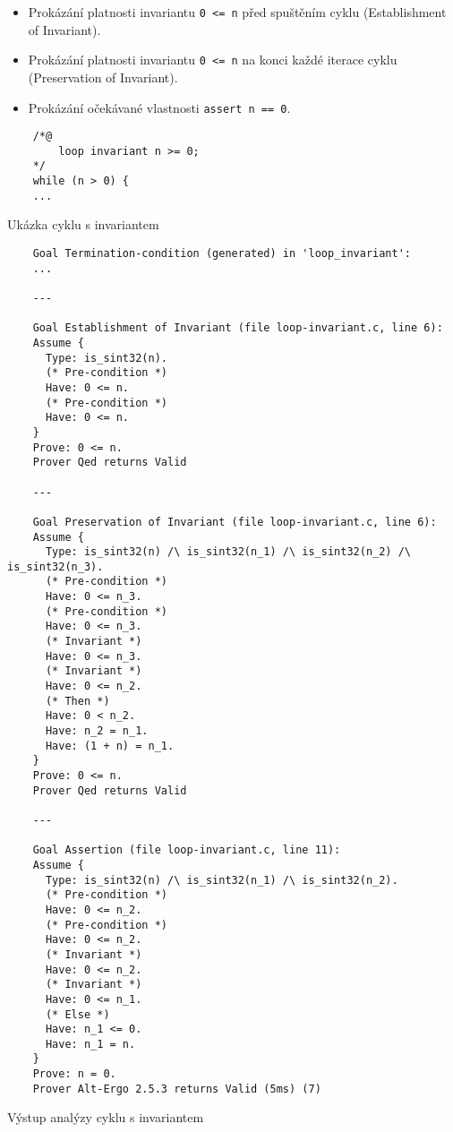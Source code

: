 \begin{itemize}
    \item Prokázání platnosti invariantu \texttt{0 <= n} před spuštěním cyklu (Establishment of Invariant).
    \item Prokázání platnosti invariantu \texttt{0 <= n} na konci každé iterace cyklu (Preservation of Invariant).
    \item Prokázání očekávané vlastnosti \texttt{assert n == 0}.
\end{itemize}

\begin{listing}[H]
    \begin{verbatim}
    /*@
        loop invariant n >= 0;
    */
    while (n > 0) {
    ...
    \end{verbatim}
    \caption{Ukázka cyklu s invariantem}
    \label{list:loop-with-invariant}
\end{listing}

\begin{listing}[H]
    \begin{verbatim}
    Goal Termination-condition (generated) in 'loop_invariant':
    ...

    ---

    Goal Establishment of Invariant (file loop-invariant.c, line 6):
    Assume {
      Type: is_sint32(n).
      (* Pre-condition *)
      Have: 0 <= n.
      (* Pre-condition *)
      Have: 0 <= n.
    }
    Prove: 0 <= n.
    Prover Qed returns Valid

    ---

    Goal Preservation of Invariant (file loop-invariant.c, line 6):
    Assume {
      Type: is_sint32(n) /\ is_sint32(n_1) /\ is_sint32(n_2) /\ is_sint32(n_3).
      (* Pre-condition *)
      Have: 0 <= n_3.
      (* Pre-condition *)
      Have: 0 <= n_3.
      (* Invariant *)
      Have: 0 <= n_3.
      (* Invariant *)
      Have: 0 <= n_2.
      (* Then *)
      Have: 0 < n_2.
      Have: n_2 = n_1.
      Have: (1 + n) = n_1.
    }
    Prove: 0 <= n.
    Prover Qed returns Valid

    ---

    Goal Assertion (file loop-invariant.c, line 11):
    Assume {
      Type: is_sint32(n) /\ is_sint32(n_1) /\ is_sint32(n_2).
      (* Pre-condition *)
      Have: 0 <= n_2.
      (* Pre-condition *)
      Have: 0 <= n_2.
      (* Invariant *)
      Have: 0 <= n_2.
      (* Invariant *)
      Have: 0 <= n_1.
      (* Else *)
      Have: n_1 <= 0.
      Have: n_1 = n.
    }
    Prove: n = 0.
    Prover Alt-Ergo 2.5.3 returns Valid (5ms) (7)
    \end{verbatim}
    \caption{Výstup analýzy cyklu s invariantem}
    \label{list:loop-with-invariant-output}
\end{listing}

